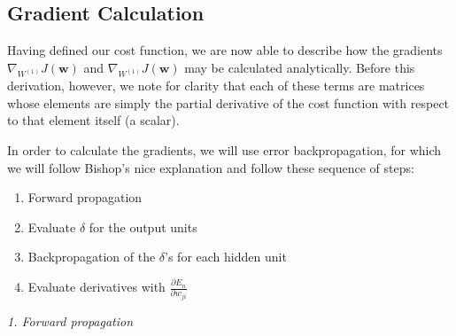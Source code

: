 \documentclass[10pt]{article}
\begin{document}
\subsection*{Gradient Calculation}

Having defined our cost function, we are now able to describe how the gradients $\nabla_{W^{(1)}} J(\mathbf{w})$ and $\nabla_{W^{(1)}} J(\mathbf{w})$ may be calculated analytically.  Before this derivation, however, we note for clarity that each of these terms are matrices whose elements are simply the partial derivative of the cost function with respect to that element itself (a scalar).

In order to calculate the gradients, we will use error backpropagation, for which we will follow Bishop's nice explanation and follow these sequence of steps:

\begin{enumerate}
 \item Forward propagation
 \item Evaluate $\delta$ for the output units
 \item Backpropagation of the $\delta$'s for each hidden unit
 \item Evaluate derivatives with $\frac{\partial E_n}{\partial w_{ji}}$
\end{enumerate}

\textit{1. Forward propagation}
\end{document}
